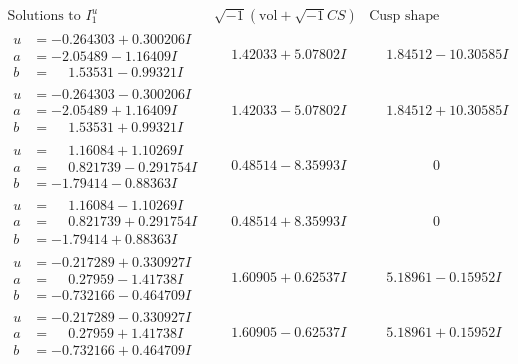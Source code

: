 \documentclass[1p]{elsarticle_modified}
\theoremstyle{definition}
\newcommand{\I}{\sqrt{-1}}
\begin{document}
$$\begin{array}{c|c|c}
\text{Solutions to }I^u_{1}& \I (\text{vol} + \sqrt{-1}CS) & \text{Cusp shape}\\
 \hline 
\begin{aligned}
u &= -0.264303 + 0.300206 I \\
a &= -2.05489 - 1.16409 I \\
b &= \phantom{-}1.53531 - 0.99321 I\end{aligned}
 & \phantom{-}1.42033 + 5.07802 I & \phantom{-}1.84512 - 10.30585 I \\ \hline\begin{aligned}
u &= -0.264303 - 0.300206 I \\
a &= -2.05489 + 1.16409 I \\
b &= \phantom{-}1.53531 + 0.99321 I\end{aligned}
 & \phantom{-}1.42033 - 5.07802 I & \phantom{-}1.84512 + 10.30585 I \\ \hline\begin{aligned}
u &= \phantom{-}1.16084 + 1.10269 I \\
a &= \phantom{-}0.821739 - 0.291754 I \\
b &= -1.79414 - 0.88363 I\end{aligned}
 & \phantom{-}0.48514 - 8.35993 I & \phantom{-0.000000 } 0 \\ \hline\begin{aligned}
u &= \phantom{-}1.16084 - 1.10269 I \\
a &= \phantom{-}0.821739 + 0.291754 I \\
b &= -1.79414 + 0.88363 I\end{aligned}
 & \phantom{-}0.48514 + 8.35993 I & \phantom{-0.000000 } 0 \\ \hline\begin{aligned}
u &= -0.217289 + 0.330927 I \\
a &= \phantom{-}0.27959 - 1.41738 I \\
b &= -0.732166 - 0.464709 I\end{aligned}
 & \phantom{-}1.60905 + 0.62537 I & \phantom{-}5.18961 - 0.15952 I \\ \hline\begin{aligned}
u &= -0.217289 - 0.330927 I \\
a &= \phantom{-}0.27959 + 1.41738 I \\
b &= -0.732166 + 0.464709 I\end{aligned}
 & \phantom{-}1.60905 - 0.62537 I & \phantom{-}5.18961 + 0.15952 I \\ \hline\begin{aligned}

\end{aligned}
\end{array}$$
\end{document}
